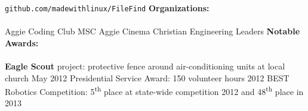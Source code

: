 \documentclass[12pt]{article}
\newcommand{\upspace}{\vspace{0.5px}}
\newcommand{\zzz}[1]{\upspace \0 \textbf{#1} \\ \vspace{-0.7\baselineskip} \hrulefill \vspace{-2px} \\ }
\newcommand{\aaa}{\upspace \1}
\newcommand{\bbb}{\upspace \2}
\begin{document}
\begin{flushleft}
\begin{outline}[compactitem]
		\verb|github.com/madewithlinux/FileFind|
\zzz{Organizations:}
	\aaa Aggie Coding Club \hfill{}\hspace{1px} MSC Aggie Cinema \hfill{}\hspace{1px} Christian Engineering Leaders
\zzz{Notable Awards:}
	\aaa \textbf{Eagle Scout} project: protective fence around air-conditioning units at local church \hfill May 2012
	\aaa Presidential Service Award: 150 volunteer hours \hfill 2012
	\aaa BEST Robotics Competition: 5\textsuperscript{th} place at state-wide competition 2012 and 48\textsuperscript{th} place in 2013

\end{outline}
\end{flushleft}
\end{document}
